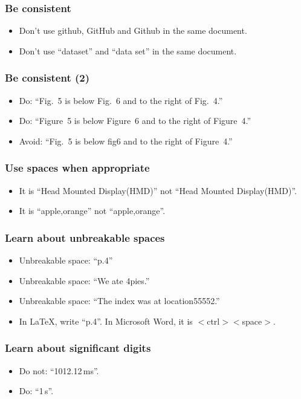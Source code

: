 \documentclass[handout]{beamer}
\begin{document}
\frame
{
  \frametitle{Be consistent}

 \begin{itemize}
  \item<1->  Don't use github, GitHub and Github in the same document.
  \item<2->  Don't use ``dataset'' and ``data set'' in the same document.
 \end{itemize}
 }

\frame
{
  \frametitle{Be consistent (2)}
  \begin{itemize}
  \item<1->  Do: ``Fig.~5 is below Fig.~6 and to the right of Fig.~4.''
  \item<2->  Do: ``Figure~5 is below Figure~6 and to the right of Figure~4.''
  \item<3->  Avoid: ``Fig.~5 is below fig6 and to the right of Figure~4.''
 \end{itemize}
 }

\frame
{
  \frametitle{Use spaces when appropriate}

 \begin{itemize}
  \item<1->  It is ``Head Mounted Display(HMD)'' not  ``Head Mounted Display(HMD)''.
  \item<2->  It is ``apple,orange'' not  ``apple,orange''.
 \end{itemize}
 }


\frame
{
  \frametitle{Learn about unbreakable spaces}

 \begin{itemize}
  \item<1->  Unbreakable space: ``p.4''
  \item<2->  Unbreakable space: ``We ate 4pies.''
  \item<2->  Unbreakable space: ``The index was at location55552.''
  \item<3->  In \LaTeX{}, write ``p.\texttildelow{}4''. In Microsoft Word, it is $<$ctrl$><$space$>$.
 \end{itemize}
 }

\frame
{
  \frametitle{Learn about significant digits}

 \begin{itemize}
  \item<1->  Do not: ``1012.12\,ms''.
  \item<2->  Do: ``1\,s''.
 \end{itemize}
 }
\end{document}
